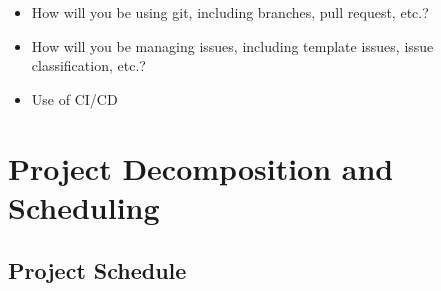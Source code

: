\documentclass{article}
\begin{document}
\begin{itemize}
	\item How will you be using git, including branches, pull request, etc.?
	\item How will you be managing issues, including template issues, issue
	classification, etc.?
  \item Use of CI/CD
\end{itemize}

\section{Project Decomposition and Scheduling}

\subsection{Project Schedule}
\end{document}
